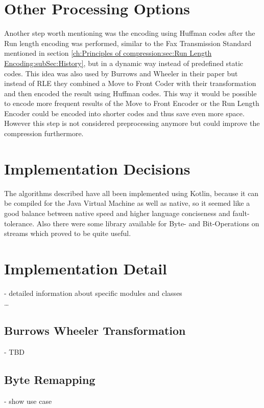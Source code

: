 {{\section{Other Processing Options}
\label{ch:Conceptual Design:sec:Postprocessing}
Another step worth mentioning was the encoding using Huffman codes after the Run length encoding was performed, similar to the Fax Transmission Standard mentioned in section \ref{ch:Principles of compression:sec:Run Length Encoding:subSec:History}, but in a dynamic way instead of predefined static codes. This idea was also used by Burrows and Wheeler in their paper \cite{Burrows94} but instead of RLE they combined a Move to Front Coder with their transformation and then encoded the result using Huffman codes. This way it would be possible to encode more frequent results of the Move to Front Encoder or the Run Length Encoder could be encoded into shorter codes and thus save even more space. However this step is not considered preprocessing anymore but could improve the compression furthermore.

\section{Implementation Decisions}
\label{ch:Conceptual Design:sec:Implementation Decisions}

The algorithms described have all been implemented using Kotlin, because it can be compiled for the Java Virtual Machine as well as native, so it seemed like a good balance between native speed and higher language conciseness and fault-tolerance. Also there were some library available for Byte- and Bit-Operations on streams which proved to be quite useful.

\section{Implementation Detail}
\label{ch:Conceptual Design:sec:Implementation Detail}
- detailed information about specific modules and classes\\
\ldots

\subsection{Burrows Wheeler Transformation}
- TBD\\
\subsection{Byte Remapping}
- show use case \\

}}
